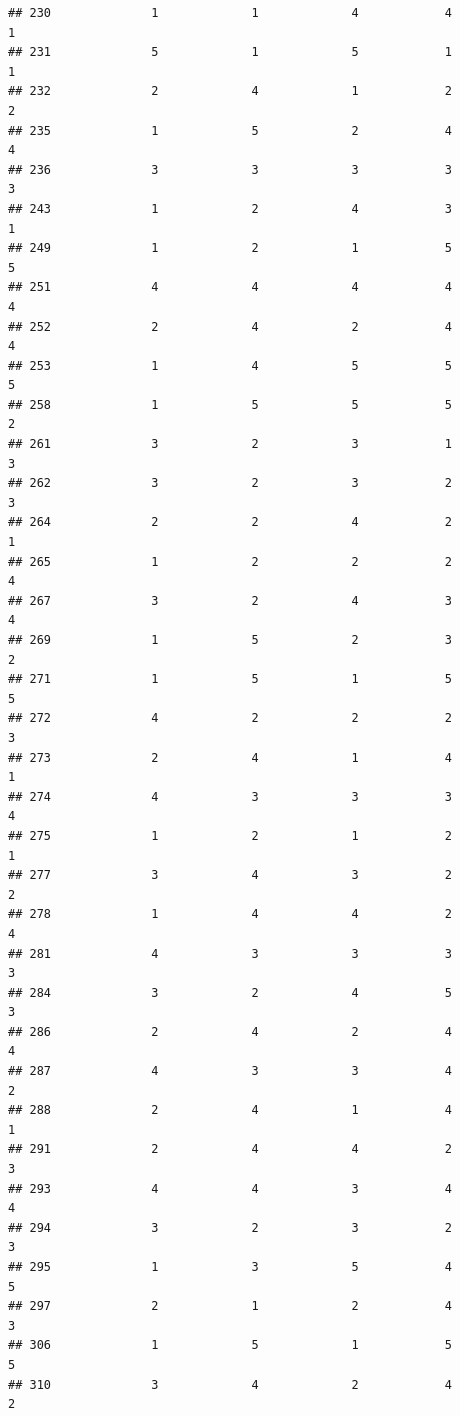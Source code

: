 \documentclass[
]{article}
\begin{document}
\begin{verbatim}
## 230              1             1             4            4          1
## 231              5             1             5            1          1
## 232              2             4             1            2          2
## 235              1             5             2            4          4
## 236              3             3             3            3          3
## 243              1             2             4            3          1
## 249              1             2             1            5          5
## 251              4             4             4            4          4
## 252              2             4             2            4          4
## 253              1             4             5            5          5
## 258              1             5             5            5          2
## 261              3             2             3            1          3
## 262              3             2             3            2          3
## 264              2             2             4            2          1
## 265              1             2             2            2          4
## 267              3             2             4            3          4
## 269              1             5             2            3          2
## 271              1             5             1            5          5
## 272              4             2             2            2          3
## 273              2             4             1            4          1
## 274              4             3             3            3          4
## 275              1             2             1            2          1
## 277              3             4             3            2          2
## 278              1             4             4            2          4
## 281              4             3             3            3          3
## 284              3             2             4            5          3
## 286              2             4             2            4          4
## 287              4             3             3            4          2
## 288              2             4             1            4          1
## 291              2             4             4            2          3
## 293              4             4             3            4          4
## 294              3             2             3            2          3
## 295              1             3             5            4          5
## 297              2             1             2            4          3
## 306              1             5             1            5          5
## 310              3             4             2            4          2

\end{verbatim}
\end{document}

